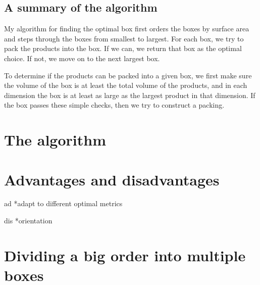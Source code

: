 \documentclass[11pt]{amsart}
\begin{document}
\subsection*{A summary of the algorithm}

My algorithm for finding the optimal box first orders the boxes by surface area and steps through the boxes from smallest to largest. For each box, we try to pack the products into the box. If we can, we return that box as the optimal choice. If not, we move on to the next largest box.

To determine if the products can be packed into a given box, we first make sure the volume of the box is at least the total volume of the products, and in each dimension the box is at least as large as the largest product in that dimension. If the box passes these simple checks, then we try to construct a packing.



\section*{The algorithm}

\begin{figure}[h]
{}
\label{apmd}
\end{figure}

\section*{Advantages and disadvantages}

ad
*adapt to different optimal metrics

dis
*orientation

\section*{Dividing a big order into multiple boxes}
\end{document}
